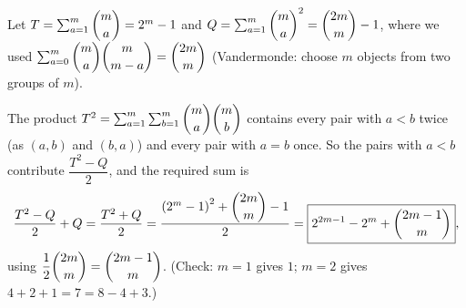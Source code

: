 Let $T=\sum_{a=1}^{m}\dbinom ma=2^m-1$ and $Q=\sum_{a=1}^{m}\dbinom ma^2=\dbinom{2m}{m}-1$, where we used $\sum_{a=0}^{m}\dbinom ma\dbinom m{m-a}=\dbinom{2m}{m}$ (Vandermonde: choose $m$ objects from two groups of $m$).

The product $T^2=\sum_{a=1}^m\sum_{b=1}^m\dbinom ma\dbinom mb$ contains every pair with $a<b$ twice (as $(a,b)$ and $(b,a)$) and every pair with $a=b$ once. So the pairs with $a<b$ contribute $\dfrac{T^2-Q}{2}$, and the required sum is
\[\dfrac{T^2-Q}{2}+Q=\dfrac{T^2+Q}{2}=\dfrac{\left(2^m-1\right)^2+\dbinom{2m}m-1}{2}=\boxed{2^{2m-1}-2^m+\dbinom{2m-1}{m}},\]
using $\dfrac12\dbinom{2m}{m}=\dbinom{2m-1}{m}$. (Check: $m=1$ gives $1$; $m=2$ gives $4+2+1=7=8-4+3$.)
